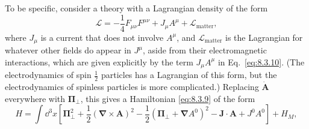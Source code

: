 To be specific, consider a theory with a Lagrangian density of the form
\begin{equation}
  \mathcal L=-\frac14F_{\mu\nu}F^{\mu\nu}+J_\mu A^\mu
  +\mathcal L_{\mathrm{matter}},
  \tag{8.3.10}\label{eq:8.3.10}
\end{equation}
where $J_\mu$ is a current that does not involve $A^\mu$, and
$\mathcal L_{\mathrm{matter}}$ is the Lagrangian for whatever other fields do
appear in $J^\mu$, aside from their electromagnetic interactions, which are
given explicitly by the term $J_\mu A^\mu$ in Eq.~\eqref{eq:8.3.10}. (The
electrodynamics of spin $\tfrac12$ particles has a Lagrangian of this form,
but the electrodynamics of spinless particles is more complicated.) Replacing
$\dot{\mathbf A}$ everywhere with $\boldsymbol\Pi_\perp$, this gives a
Hamiltonian \eqref{eq:8.3.9} of the form
\[
  H=\int \dd^3x\left[
  \boldsymbol\Pi_\perp^2
  +\frac12(\boldsymbol\nabla\times\mathbf A)^2
  -\frac12(\boldsymbol\Pi_\perp+\boldsymbol\nabla A^0)^2
  -\mathbf J\cdot\mathbf A+J^0A^0\right]+H_M,
\]
